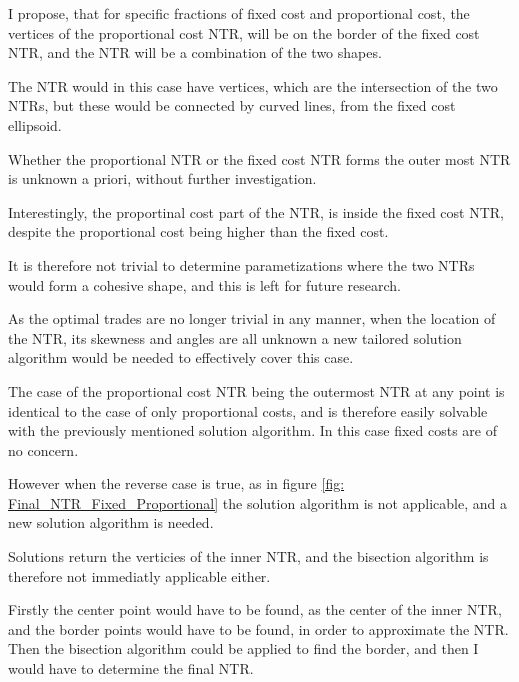 \documentclass[11pt]{article}
\begin{document}
I propose, that for specific fractions of fixed cost and proportional cost, the vertices of the proportional cost NTR,
will be on the border of the fixed cost NTR, and the NTR will be a combination of the two shapes.

The NTR would in this case have vertices, which are the intersection of the two NTRs, but these would be connected by curved lines, from the fixed cost ellipsoid.

Whether the proportional NTR or the fixed cost NTR forms the outer most NTR is unknown a priori, without further investigation.

Interestingly, the proportinal cost part of the \ac{NTR}, is inside the fixed cost NTR, despite the proportional cost being higher than the fixed cost.

It is therefore not trivial to determine parametizations where the two NTRs would form a cohesive shape, and this is left for future research.

As the optimal trades are no longer trivial in any manner, when the location of the \ac{NTR}, its skewness and angles are all unknown
a new tailored solution algorithm would be needed to effectively cover this case.

The case of the proportional cost NTR being the outermost NTR at any point is identical to the case of only proportional costs,
and is therefore easily solvable with the previously mentioned solution algorithm. In this case fixed costs are of no concern.

However when the reverse case is true, as in figure \ref{fig: Final_NTR_Fixed_Proportional} the solution algorithm is not applicable, and a new solution algorithm is needed.

Solutions return the verticies of the inner NTR, and the bisection algorithm is therefore not immediatly applicable either.

Firstly the center point would have to be found, as the center of the inner NTR, and the border points would have to be found, in order to approximate the NTR.
Then the bisection algorithm could be applied to find the border, and then I would have to determine the final NTR.
\end{document}
